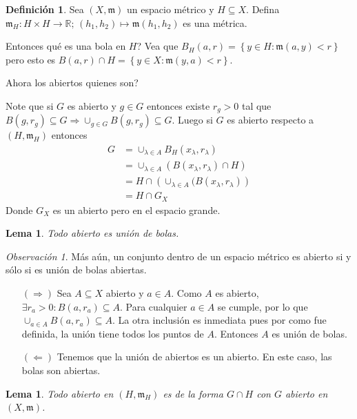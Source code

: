 \documentclass[12pt]{article}
\theoremstyle{plain}
\newtheorem{Lem}[Th]{Lema}             %
\theoremstyle{definition}
\newtheorem{Def}[Th]{Definición}       %
\theoremstyle{remark}
\newtheorem{Rmk}[Th]{Observación}      %
\numberwithin{equation}{section}
\newcommand{\bR}{\mathbb{R}}        %
\newcommand{\mm}{\mathfrak{m}}      %
\renewcommand{\:}{\colon}           %
\newcommand{\conj}[1]{\left\lbrace#1\right\rbrace}
\begin{document}
\begin{multicols}{2}
\begin{Def}
  Sea $(X,\mm)$ un espacio métrico y $H\subseteq X$. Defina $\mm_H\colon H\times H\to\bR;\, (h_1,h_2)\mapsto \mm(h_1,h_2)$ es una métrica.
\end{Def}

Entonces qué es una bola en $H$? Vea que $B_H(a,r)=\conj{y\in H\colon \mm(a,y)<r}$ pero esto es $B(a,r)\cap H=\conj{y\in X\colon \mm(y,a)<r}$.
\par
Ahora los abiertos quienes son?\par
Note que si $G$ es abierto y $g\in G$ entonces existe $r_g>0$ tal que $B(g,r_g)\subseteq G\Rightarrow \cup_{g\in G}B(g,r_g)\subseteq G$. Luego si $G$ es abierto respecto a $(H,\mm_H)$ entonces
\begin{align*}
  G&=\cup_{\lambda\in A}B_H(x_\lambda,r_\lambda) \\
   &=\cup_{\lambda\in A}(B(x_\lambda,r_\lambda)\cap H)\\
   &=H\cap \left(\cup_{\lambda\in A}(B(x_\lambda,r_\lambda)\right)\\
   &= H\cap G_X
\end{align*}
Donde $G_X$ es un abierto pero en el espacio grande.

\begin{Lem}
  Todo abierto es unión de bolas.
\end{Lem}

\begin{Rmk}\label{rmk:topoEspMetrico}
  Más aún, un conjunto dentro de un espacio métrico es abierto si y sólo si es unión de bolas abiertas.
\end{Rmk}

\begin{ptcb}
\begin{enumerate}
  \item[$(\Rightarrow)$] Sea $A\subseteq X$ abierto y $a\in A$. Como $A$ es abierto, $\exists r_a>0\colon B(a,r_a)\subseteq A$. Para cualquier $a\in A$ se cumple, por lo que $\cup_{a\in A}B(a,r_a)\subseteq A$. La otra inclusión es inmediata pues por como fue definida, la unión tiene todos los puntos de $A$. Entonces $A$ es unión de bolas.
  \item[$(\Leftarrow)$] Tenemos que la unión de abiertos es un abierto. En este caso, las bolas son abiertas.
\end{enumerate}
\end{ptcb}

\begin{Lem}
  Todo abierto en $(H,\mm_H)$ es de la forma $G\cap H$ con $G$ abierto en $(X,\mm)$.
\end{Lem}


\end{multicols}
\end{document}
